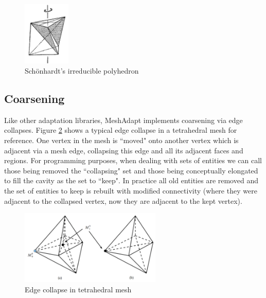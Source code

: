 \begin{figure}
\begin{center}
\includegraphics[width=0.2\textwidth]{schonhardt.png}
\caption{Sch{\"o}nhardt's irreducible polyhedron
\cite{Schonhardt1928}}
\label{fig:schonhardt}
\end{center}
\end{figure}

\subsection{Coarsening}
\label{sec:ma_coarsen}

Like other adaptation libraries, MeshAdapt implements
coarsening via edge collapses.
Figure \ref{fig:collapse} shows a typical edge collapse
in a tetrahedral mesh for reference.
One vertex in the mesh is ``moved" onto another vertex which is adjacent
via a mesh edge, collapsing this edge and all its adjacent
faces and regions.
For programming purposes, when dealing with sets of entities we
can call those being removed the ``collapsing" set and those being
conceptually elongated to fill the cavity as the set to ``keep".
In practice all old entities are removed and the set of entities to keep
is rebuilt with modified connectivity (where they were adjacent to the
collapsed vertex, now they are adjacent to the kept vertex).

\begin{figure}
\begin{center}
\includegraphics[width=0.6\textwidth]{collapse.png}
\caption{Edge collapse in tetrahedral mesh
\cite{lu2011developments}}
\label{fig:collapse}
\end{center}
\end{figure}

